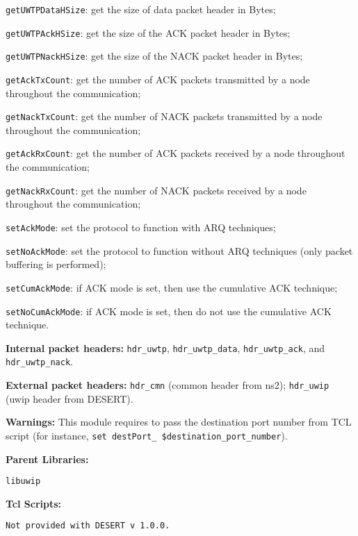 \begin{description}
\begin{description}
      \item{\tt getUWTPDataHSize}: get the size of data packet header in Bytes;
      \item{\tt getUWTPAckHSize}: get the size of the ACK packet header in Bytes; 
      \item{\tt getUWTPNackHSize}: get the size of the NACK packet header in Bytes;
      \item{\tt getAckTxCount}: get the number of ACK packets transmitted by a node throughout the communication;
      \item{\tt getNackTxCount}: get the number of NACK packets transmitted by a node throughout the communication;
      \item{\tt getAckRxCount}: get the number of ACK packets received by a node throughout the communication;
      \item{\tt getNackRxCount}: get the number of NACK packets received by a node throughout the communication;
      \item{\tt setAckMode}: set the protocol to function with ARQ techniques;
      \item{\tt setNoAckMode}: set the protocol to function without ARQ techniques (only packet buffering is performed);
      \item{\tt setCumAckMode}: if ACK mode is set, then use the cumulative ACK technique;
      \item{\tt setNoCumAckMode}: if ACK mode is set, then do not use the cumulative ACK technique.
    \end{description}
   \item {\bf Internal packet headers:} {\tt hdr\_uwtp}, {\tt hdr\_uwtp\_data}, {\tt hdr\_uwtp\_ack}, and {\tt hdr\_uwtp\_nack}.
   \item {\bf External packet headers:} {\tt hdr\_cmn} (common header from ns2); {\tt hdr\_uwip} (uwip header from DESERT).
   \item {\bf Warnings:} This module requires to pass the destination port number from TCL script (for instance, {\tt set destPort\_ \$destination\_port\_number}).
   \item {\bf Parent Libraries:}
   \begin{description}
   \item {\tt libuwip}
   \end{description}
   \item {\bf Tcl Scripts:} 
   \begin{description}
   \item {\tt Not provided with DESERT v 1.0.0.}
   \end{description}
\end{description}

